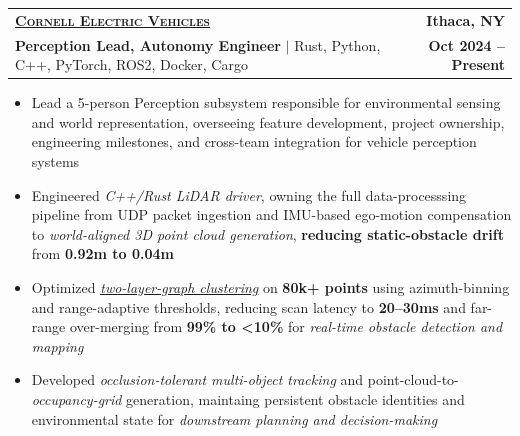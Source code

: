 \documentclass[letterpaper,11pt]{article}
\makeatletter
\newcommand{\link}[2]{\href{#1}{\uline{#2}}}
\newcommand{\entry}[4]{%
  \item
  \begin{tabular*}{\textwidth}[t]{l@{\extracolsep{\fill}}r}
    #1 & #2 \\
    #3 & #4 \\
  \end{tabular*}\vspace{-6pt}}
\newcommand{\bullets}{\begin{itemize}[leftmargin=0.18in, itemsep=0pt, parsep=0pt, topsep=3pt, partopsep=0pt, label=\textbullet]}
\newcommand{\bulletsend}{\end{itemize}\vspace{-3pt}}
\makeatother
\begin{document}
  \entry{\large \scshape \link{https://www.cornellelectricvehicles.org/}{\textbf{Cornell Electric Vehicles}}}{\textbf{Ithaca, NY}}
        {\textbf{Perception Lead, Autonomy Engineer}  $|$ Rust, Python, C++, PyTorch, ROS2, Docker, Cargo}{\textbf{Oct 2024 -- Present}}
  \bullets
    \item Lead a 5-person Perception subsystem responsible for environmental sensing and world representation, overseeing feature development, 
      project ownership, engineering milestones, and cross-team integration for vehicle perception systems
    \item Engineered \textit{C++/Rust LiDAR driver}, owning the full data-processsing pipeline from UDP packet ingestion and
      IMU-based ego-motion compensation to \textit{world-aligned 3D point cloud generation}, \textbf{reducing static-obstacle drift} 
      from \textbf{0.92m to 0.04m}
    \item Optimized \link{https://www.mdpi.com/2076-3417/10/23/8534}{\textit{two-layer-graph clustering}}
      on \textbf{80k+ points} using azimuth-binning and range-adaptive thresholds, reducing scan latency to
      \textbf{20--30ms} and far-range over-merging from \textbf{99\% to <10\%} for \textit{real-time obstacle detection and mapping}
    \item Developed \textit{occlusion-tolerant multi-object tracking} and point-cloud-to-\textit{occupancy-grid} generation, maintaing 
      persistent obstacle identities and environmental state for \textit{downstream planning and decision-making}
  \bulletsend
\end{document}

